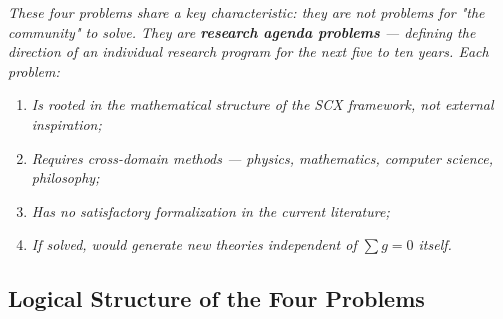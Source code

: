 \documentclass[12pt,a4paper]{article}
\theoremstyle{remark}
\DeclareMathOperator{\Audit}{Audit}
\begin{document}
\medskip
\noindent\textit{These four problems share a key characteristic: they are not problems for "the community" to solve. They are \textbf{research agenda problems} — defining the direction of an individual research program for the next five to ten years. Each problem:}
\begin{enumerate}[label=(\arabic*)]
    \item \textit{Is rooted in the mathematical structure of the SCX framework, not external inspiration;}
    \item \textit{Requires cross-domain methods — physics, mathematics, computer science, philosophy;}
    \item \textit{Has no satisfactory formalization in the current literature;}
    \item \textit{If solved, would generate new theories independent of $\sum g = 0$ itself.}
\end{enumerate}

\subsection{ Logical Structure of the Four Problems}



\begin{center}
\end{center}
\end{document}
